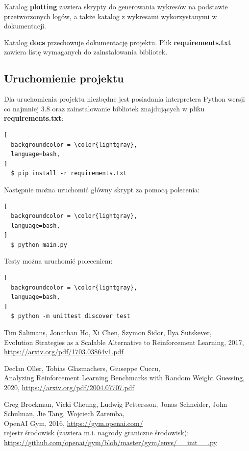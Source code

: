 \documentclass[12pt,a4paper]{article}
\begin{document}
Katalog \textbf{plotting} zawiera skrypty do generowania wykresów na
podstawie przetworzonych logów, a także katalog z wykresami wykorzystanymi
w dokumentacji.

Katalog \textbf{docs} przechowuje dokumentację projektu.
Plik \textbf{requirements.txt} zawiera listę wymaganych do zainstalowania
bibliotek.

\subsection{Uruchomienie projektu}

Dla uruchomienia projektu niezbędne jest posiadania interpretera Python wersji co najmniej 3.8
oraz zainstalowanie bibliotek znajdujących w pliku \textbf{requirements.txt}:

\begin{lstlisting}[
  backgroundcolor = \color{lightgray},
  language=bash,
]
  $ pip install -r requirements.txt
\end{lstlisting}

\bigskip

Następnie można uruchomić główny skrypt za pomocą polecenia:

\begin{lstlisting}[
  backgroundcolor = \color{lightgray},
  language=bash,
]
  $ python main.py
\end{lstlisting}

Testy można uruchomić poleceniem:

\begin{lstlisting}[
  backgroundcolor = \color{lightgray},
  language=bash,
]
  $ python -m unittest discover test
\end{lstlisting}

\pagebreak
\begin{thebibliography}{9}
  Tim Salimans, Jonathan Ho, Xi Chen, Szymon Sidor, Ilya Sutskever,\\
  Evolution Strategies as a Scalable Alternative to Reinforcement Learning,
  2017, \href{https://arxiv.org/pdf/1703.03864v1.pdf}{https://arxiv.org/pdf/1703.03864v1.pdf}

  Declan Oller, Tobias Glasmachers, Giuseppe Cuccu, \\
  Analyzing Reinforcement Learning Benchmarks with Random Weight Guessing,
  2020, \href{https://arxiv.org/pdf/2004.07707.pdf}{https://arxiv.org/pdf/2004.07707.pdf}

  Greg Brockman, Vicki Cheung, Ludwig Pettersson, Jonas Schneider, John Schulman, Jie Tang, Wojciech Zaremba,\\
  OpenAI Gym, 2016, \href{https://gym.openai.com/}{https://gym.openai.com/} \\
  rejestr środowisk (zawiera m.i. nagrody graniczne środowisk): \\
  \href{https://github.com/openai/gym/blob/master/gym/envs/\_\_init\_\_.py}{https://github.com/openai/gym/blob/master/gym/envs/\_\_init\_\_.py}

\end{thebibliography}
\end{document}
